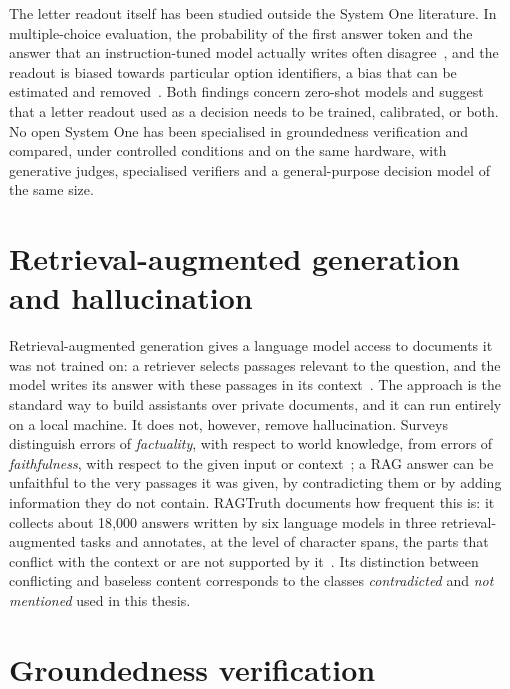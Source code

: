 The letter readout itself has been studied outside the System One literature. In multiple-choice evaluation, the
probability of the first answer token and the answer that an instruction-tuned model actually writes often
disagree~\cite{wang2024myanswerc}, and the readout is biased towards particular option identifiers, a bias that can be
estimated and removed~\cite{zheng2024mcq}. Both findings concern zero-shot models and suggest that a letter readout used
as a decision needs to be trained, calibrated, or both. No open System One has been specialised in groundedness
verification and compared, under controlled conditions and on the same hardware, with generative judges, specialised
verifiers and a general-purpose decision model of the same size.

\section{Retrieval-augmented generation and hallucination}
\label{sec:bg-rag}

Retrieval-augmented generation gives a language model access to documents it was not trained on: a retriever selects
passages relevant to the question, and the model writes its answer with these passages in its
context~\cite{lewis2020rag}. The approach is the standard way to build assistants over private documents, and it can
run entirely on a local machine. It does not, however, remove hallucination. Surveys distinguish errors of
\emph{factuality}, with respect to world knowledge, from errors of \emph{faithfulness}, with respect to the given input or
context~\cite{huang2025hallucination}; a RAG answer can be unfaithful to the very passages it was given, by contradicting
them or by adding information they do not contain. RAGTruth documents how frequent this is: it collects about 18{,}000
answers written by six language models in three retrieval-augmented tasks and annotates, at the level of character
spans, the parts that conflict with the context or are not supported by it~\cite{niu2024ragtruth}. Its distinction
between conflicting and baseless content corresponds to the classes \emph{contradicted} and \emph{not mentioned} used
in this thesis.

\section{Groundedness verification}
\label{sec:bg-verification}

